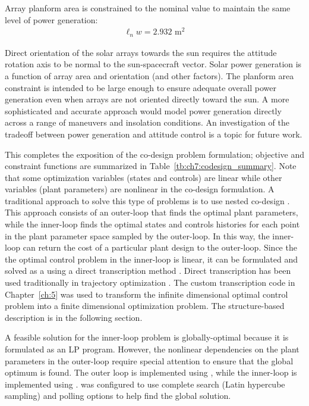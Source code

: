 \noindent Array planform area is constrained to the nominal value to maintain the same level of power generation:
\begin{align}
\ell_{n}w = 2.932 \text{ m}^2 \tag{\theequation j} \label{eq:ch7:area_con}
\end{align}

\noindent Direct orientation of the solar arrays towards the sun requires the attitude rotation axis to be normal to the sun-spacecraft vector. Solar power generation is a function of array area and orientation (and other factors). The planform area constraint is intended to be large enough to ensure adequate overall power generation even when arrays are not oriented directly toward the sun. A more sophisticated and accurate approach would model power generation directly across a range of maneuvers and insolation conditions. An investigation of the tradeoff between power generation and attitude control is a topic for future work.

This completes the exposition of the co-design problem formulation; objective and constraint functions are summarized in Table~\ref{tb:ch7:codesign_summary}. Note that some optimization variables (states and controls) are linear while other variables (plant parameters) are nonlinear in the co-design formulation. A traditional approach to solve this type of problems is to use nested co-design \cite{Allison2014b,  Fathy2001a, Herber2017b}. 
This approach consists of an outer-loop that finds the optimal plant parameters, while the inner-loop finds the optimal states and controls histories for each point in the plant parameter space sampled by the outer-loop. In this way, the inner-loop can return the cost of a particular plant design to the outer-loop. Since the the optimal control problem in the inner-loop is linear, it can be formulated and solved as a  using a direct transcription method \cite{Enright1992a, Betts2010a, Biegler2010a, Herber2014a}. Direct transcription has been used traditionally in trajectory optimization \cite{Chilan2013a, Betts2010a, Morgan2014a}. The custom transcription code in Chapter~\ref{ch:5} was used to transform the infinite dimensional optimal control problem into a finite dimensional optimization problem.
The structure-based description is in the following section.

A feasible solution for the inner-loop problem is globally-optimal because it is formulated as an LP program. However, the nonlinear dependencies on the plant parameters in the outer-loop require special attention to ensure that the global optimum is found. The outer loop is implemented using   \cite{matlab-patternsearch}, while the inner-loop is implemented using   \cite{matlab-quadprog}.   was configured to use complete search (Latin hypercube sampling) and polling options to help find the global solution.

